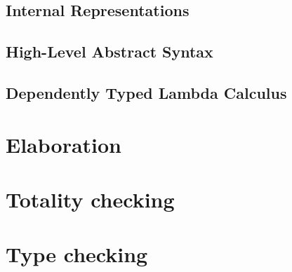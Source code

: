\subsection{Internal Representations}
\subsection{High-Level Abstract Syntax}
\subsection{Dependently Typed Lambda Calculus}
\section{Elaboration}
\label{sec:elaboration}
\section{Totality checking}
\section{Type checking}









